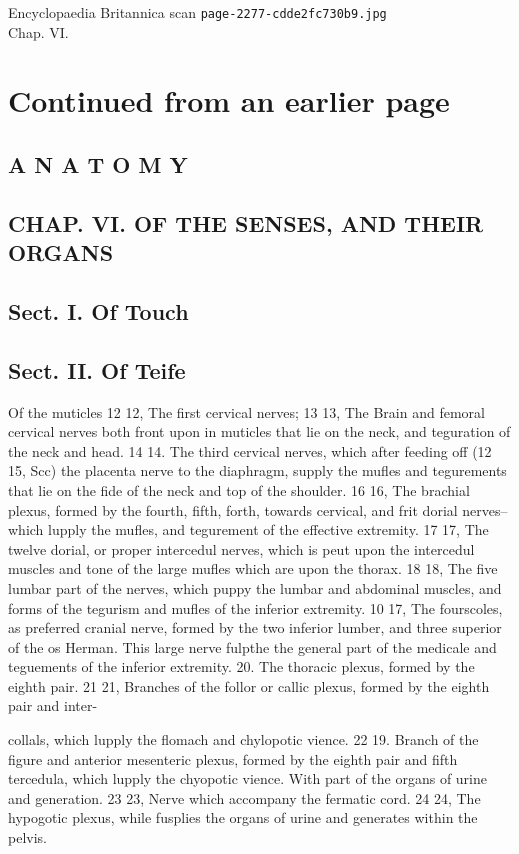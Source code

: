 \documentclass{article}
\begin{document}
\begin{center}
{\Large Encyclopaedia Britannica scan \texttt{page-2277-cdde2fc730b9.jpg}}\\[0.5em]
Chap. VI.
\end{center}
\section*{Continued from an earlier page}
\subsection*{A N A T O M Y}
\subsection*{CHAP. VI. OF THE SENSES, AND THEIR ORGANS}
\subsection*{Sect. I. Of Touch}
\subsection*{Sect. II. Of Teife}
Of the muticles 12 12, The first cervical nerves; 13 13, The Brain and femoral cervical nerves both front upon in muticles that lie on the neck, and teguration of the neck and head. 14 14. The third cervical nerves, which after feeding off (12 15, Scc) the placenta nerve to the diaphragm, supply the mufles and tegurements that lie on the fide of the neck and top of the shoulder. 16 16, The brachial plexus, formed by the fourth, fifth, forth, towards cervical, and frit dorial nerves--which lupply the mufles, and tegurement of the effective extremity. 17 17, The twelve dorial, or proper intercedul nerves, which is peut upon the intercedul muscles and tone of the large mufles which are upon the thorax. 18 18, The five lumbar part of the nerves, which puppy the lumbar and abdominal muscles, and forms of the tegurism and mufles of the inferior extremity. 10 17, The fourscoles, as preferred cranial nerve, formed by the two inferior lumber, and three superior of the os Herman. This large nerve fulpthe the general part of the medicale and teguements of the inferior extremity. 20. The thoracic plexus, formed by the eighth pair. 21 21, Branches of the follor or callic plexus, formed by the eighth pair and inter-

collals, which lupply the flomach and chylopotic vience. 22 19. Branch of the figure and anterior mesenteric plexus, formed by the eighth pair and fifth tercedula, which lupply the chyopotic vience. With part of the organs of urine and generation. 23 23, Nerve which accompany the fermatic cord. 24 24, The hypogotic plexus, while fusplies the organs of urine and generates within the pelvis.
\end{document}
